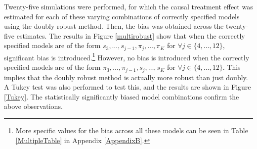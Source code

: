 Twenty-five simulations were performed, for which the causal treatment effect was estimated for each of these varying combinations of correctly specified models using the doubly robust method.   Then, the bias was obtained across the twenty-five estimates.  The results in Figure \ref{multirobust} show that when the correctly specified models are of the form $s_3, \dots, s_{j-1}, \pi_j, \dots, \pi_K$ for $\forall j \in \{4, \dots, 12 \} $, significant bias is introduced.\footnote{More specific values for the bias across all these models can be seen in Table \ref{MultipleTable} in Appendix \ref{AppendixB}.}  However, no bias is introduced when the correctly specified models are of the form $\pi_3, \dots, \pi_{j-1}, s_j, \dots, s_K $ for  $\forall j \in \{4, \dots, 12 \}$.  This implies that the doubly robust method is actually more robust than just doubly.  A Tukey test was also performed to test this, and the results are shown in Figure \ref{Tukey}.  The statistically significantly biased model combinations confirm the above observations.  

